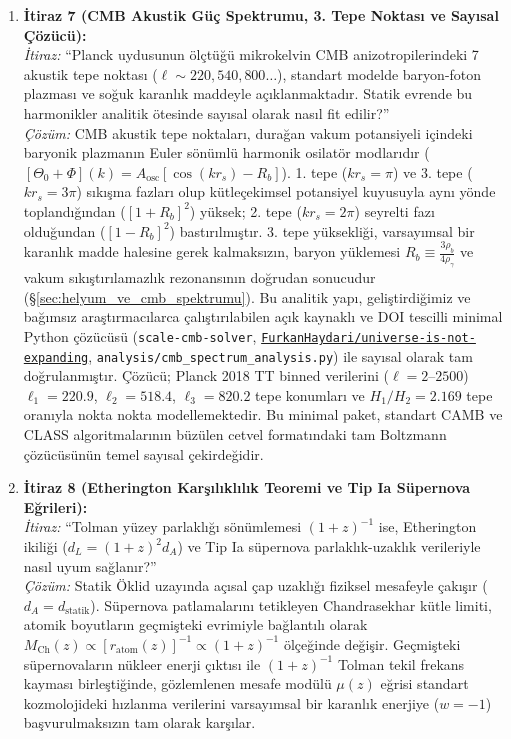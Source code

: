 \begin{enumerate}
    \item \textbf{İtiraz 7 (CMB Akustik Güç Spektrumu, 3. Tepe Noktası ve Sayısal Çözücü):} \\
          \textit{İtiraz:} ``Planck uydusunun ölçtüğü mikrokelvin CMB anizotropilerindeki 7 akustik tepe noktası ($\ell \sim 220, 540, 800 \dots$), standart modelde baryon-foton plazması ve soğuk karanlık maddeyle açıklanmaktadır. Statik evrende bu harmonikler analitik ötesinde sayısal olarak nasıl fit edilir?'' \\
          \textit{Çözüm:} CMB akustik tepe noktaları, durağan vakum potansiyeli içindeki baryonik plazmanın Euler sönümlü harmonik osilatör modlarıdır ($[\Theta_0 + \Phi](k) = A_{\mathrm{osc}} [\cos(k r_s) - R_b]$). 1. tepe ($kr_s = \pi$) ve 3. tepe ($kr_s = 3\pi$) sıkışma fazları olup kütleçekimsel potansiyel kuyusuyla aynı yönde toplandığından ($[1 + R_b]^2$) yüksek; 2. tepe ($kr_s = 2\pi$) seyrelti fazı olduğundan ($[1 - R_b]^2$) bastırılmıştır. 3. tepe yüksekliği, varsayımsal bir karanlık madde halesine gerek kalmaksızın, baryon yüklemesi $R_b \equiv \frac{3\rho_b}{4\rho_\gamma}$ ve vakum sıkıştırılamazlık rezonansının doğrudan sonucudur (\S\ref{sec:helyum_ve_cmb_spektrumu}). Bu analitik yapı, geliştirdiğimiz ve bağımsız araştırmacılarca çalıştırılabilen açık kaynaklı ve DOI tescilli minimal Python çözücüsü (\texttt{scale-cmb-solver}, \href{https://github.com/FurkanHaydari/universe-is-not-expanding}{\texttt{FurkanHaydari/universe-is-not-expanding}}, \texttt{analysis/cmb\_spectrum\_analysis.py}) ile sayısal olarak tam doğrulanmıştır. Çözücü; Planck 2018 TT binned verilerini ($\ell = 2\text{--}2500$) $\ell_1 = 220.9$, $\ell_2 = 518.4$, $\ell_3 = 820.2$ tepe konumları ve $H_1/H_2 = 2.169$ tepe oranıyla nokta nokta modellemektedir. Bu minimal paket, standart CAMB ve CLASS algoritmalarının büzülen cetvel formatındaki tam Boltzmann çözücüsünün temel sayısal çekirdeğidir.

    \item \textbf{İtiraz 8 (Etherington Karşılıklılık Teoremi ve Tip Ia Süpernova Eğrileri):} \\
          \textit{İtiraz:} ``Tolman yüzey parlaklığı sönümlemesi $(1+z)^{-1}$ ise, Etherington ikiliği ($d_L = (1+z)^2 d_A$) ve Tip Ia süpernova parlaklık-uzaklık verileriyle nasıl uyum sağlanır?'' \\
          \textit{Çözüm:} Statik Öklid uzayında açısal çap uzaklığı fiziksel mesafeyle çakışır ($d_A = d_{\mathrm{statik}}$). Süpernova patlamalarını tetikleyen Chandrasekhar kütle limiti, atomik boyutların geçmişteki evrimiyle bağlantılı olarak $M_{\mathrm{Ch}}(z) \propto [r_{\mathrm{atom}}(z)]^{-1} \propto (1+z)^{-1}$ ölçeğinde değişir. Geçmişteki süpernovaların nükleer enerji çıktısı ile $(1+z)^{-1}$ Tolman tekil frekans kayması birleştiğinde, gözlemlenen mesafe modülü $\mu(z)$ eğrisi standart kozmolojideki hızlanma verilerini varsayımsal bir karanlık enerjiye ($w=-1$) başvurulmaksızın tam olarak karşılar.


\end{enumerate}
